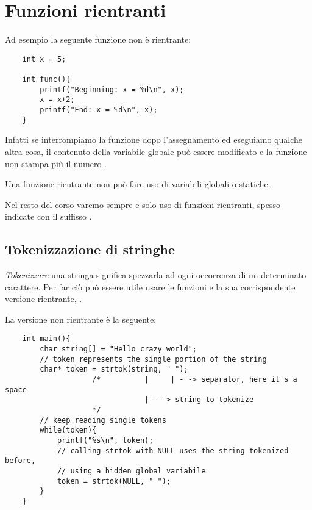 \section{Funzioni rientranti}


Ad esempio la seguente funzione non è rientrante:
\begin{verbatim}
    int x = 5;

    int func(){
        printf("Beginning: x = %d\n", x);
        x = x+2;
        printf("End: x = %d\n", x);
    }
\end{verbatim}

Infatti se interrompiamo la funzione dopo l'assegnamento  ed eseguiamo qualche altra cosa, il contenuto della variabile globale  può essere modificato e la funzione non stampa più il numero .

Una funzione rientrante non può fare uso di variabili globali o statiche.

Nel resto del corso varemo sempre e solo uso di funzioni rientranti, spesso indicate con il suffisso .

\subsection*{Tokenizzazione di stringhe}
\emph{Tokenizzare} una stringa significa spezzarla ad ogni occorrenza di un determinato carattere. Per far ciò può essere utile usare le funzioni  e la sua corrispondente versione rientrante, .

La versione non rientrante è la seguente:
\begin{verbatim}
    int main(){
        char string[] = "Hello crazy world";
        // token represents the single portion of the string
        char* token = strtok(string, " ");
                    /*          |     | - -> separator, here it's a space
                                | - -> string to tokenize
                    */
        // keep reading single tokens
        while(token){
            printf("%s\n", token);
            // calling strtok with NULL uses the string tokenized before,
            // using a hidden global variabile
            token = strtok(NULL, " ");
        }
    }
\end{verbatim}

